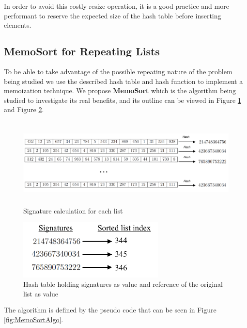 \documentclass[a4paper,12pt]{article}
\begin{document}
In order to avoid this costly resize operation, it is a good practice and more performant to reserve the expected size of the hash table before inserting elements. 

\subsection{MemoSort for Repeating Lists}
To be able to take advantage of the possible repeating nature of the problem being studied we use the described hash table and hash function to implement a memoization technique. We propose \textbf{MemoSort} which is the algorithm being studied to investigate its real benefits, and its outline can be viewed in Figure \ref{fig:MemoSortDiagram} and Figure \ref{fig:MemoSortDiagramHash}.

\begin{figure}[H]
    \centering
     \includegraphics[height=4.5cm,keepaspectratio]{./images/MemoSortDiagram.png}
    \caption{Signature calculation for each list}
    \label{fig:MemoSortDiagram}
\end{figure}

\begin{figure}[H]
    \centering
     \includegraphics[height=3cm,keepaspectratio]{./images/hashTableDiagram.png}
    \caption{Hash table holding signatures as value and reference of the original list as value}
    \label{fig:MemoSortDiagramHash}
\end{figure}

The algorithm is defined by the pseudo code that can be seen in  Figure \ref{fig:MemoSortAlgo}.
\end{document}
